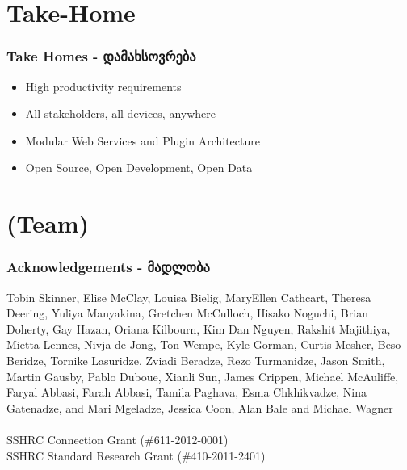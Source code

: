 \documentclass{beamer}
\begin{document}
%
%
%
%
%
%
%
%



\section{Take-Home}

\begin{frame}
\frametitle{Take Homes - დამახსოვრება}
\begin{itemize}
\item High productivity requirements
\item All stakeholders, all devices, anywhere
\item Modular Web Services and Plugin Architecture
\item Open Source, Open Development, Open Data
\end{itemize}
\end{frame}

\section*{(Team)}

\begin{frame}
\frametitle{Acknowledgements - მადლობა}


Tobin Skinner, Elise McClay, Louisa Bielig, MaryEllen Cathcart, Theresa Deering, Yuliya Manyakina, Gretchen
McCulloch, Hisako Noguchi, Brian Doherty, Gay Hazan, Oriana Kilbourn, Kim Dan
Nguyen, Rakshit Majithiya, Mietta Lennes, Nivja de Jong, Ton Wempe, Kyle
Gorman, Curtis Mesher, Beso Beridze, Tornike Lasuridze, Zviadi Beradze, Rezo
Turmanidze, Jason Smith, Martin Gausby, Pablo Duboue, Xianli Sun, James Crippen,
Michael McAuliffe, Faryal
Abbasi, Farah Abbasi, Tamila Paghava, Esma Chkhikvadze, Nina Gatenadze, and
Mari Mgeladze, Jessica Coon, Alan Bale and Michael
Wagner
~\\
~\\
SSHRC Connection Grant (\#611-2012-0001) \\
 SSHRC
Standard Research Grant (\#410-2011-2401)
\end{frame}
\end{document}
